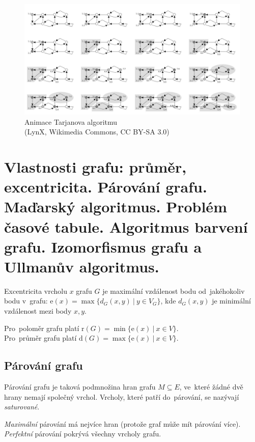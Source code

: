\begin{figure}[ht]
\centering
\includegraphics[width=\textwidth]{images/3_tarjanuv-algoritmus-animace.png}

\caption[Animace Tarjanova algoritmu]{Animace Tarjanova algoritmu\\{\small (LynX, Wikimedia Commons, CC BY-SA 3.0)}}
\end{figure}

\clearpage
\section{Vlastnosti grafu: průměr, excentricita. Párování grafu. Maďarský algoritmus. Problém časové tabule. Algoritmus barvení grafu. Izomorfismus grafu a Ullmanův algoritmus.}

Excentricita vrcholu $x$ grafu $G$ je maximální vzdálenost bodu od~jakéhokoliv bodu v~grafu: $\mathrm{e}(x) = \max\{ d_G(x, y) \ |\ y \in V_G\}$, kde $d_G(x,y)$ je minimální vzdálenost mezi body $x, y$.

{}Pro~poloměr grafu platí $\mathrm{r}(G) = \min\{ \mathrm{e}(x)\ |\ x \in V \}$.
\\Pro~průměr grafu platí $\mathrm{d}(G) = \max\{ \mathrm{e}(x)\ |\ x \in V \}$.

\subsection{Párování grafu}

Párování grafu je taková podmnožina hran grafu $M \subseteq E$, ve~které žádné dvě hrany nemají společný vrchol.
Vrcholy, které patří do~párování, se nazývají \emph{saturované}.

{}\emph{Maximální} párování má nejvíce hran (protože graf může mít párování více).
\\\emph{Perfektní} párování pokrývá všechny vrcholy grafu.

